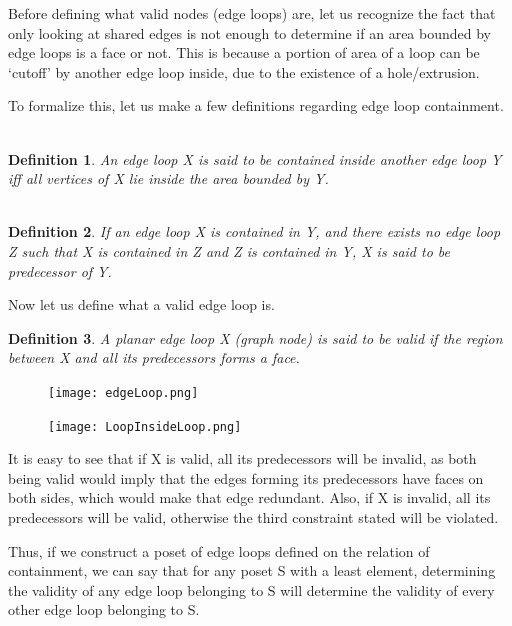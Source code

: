 \documentclass[12pt,a4paper]{article}
\newtheorem{definition}{Definition}
\begin{document}
Before defining what valid nodes (edge loops) are, let us recognize the fact that only looking at shared edges is not enough to determine if an area bounded by edge loops is a  face or not. This is because a portion of area of a loop can be ‘cutoff’ by another edge loop inside, due to the existence of a hole/extrusion. 

To formalize this, let us make a few definitions regarding edge loop containment. \\ \\
\begin{definition}
     An edge loop X is said to be contained inside another edge loop Y iff all vertices of X lie inside the area bounded by Y.  \\  \\
\end{definition}
    
    \begin{definition}
     If an edge loop X is contained in Y, and there exists no edge loop Z such that X is contained in Z and Z is contained in Y, X is said to be predecessor of Y.
        \\ 
\end{definition}
  


Now let us define what a valid edge loop  is.
\begin{definition}
     A planar edge loop X  (graph node) is said to be valid if the region between X and all its predecessors forms a face.
\end{definition}

\begin{figure}
\centering
\texttt{[image: edgeLoop.png]}
\end{figure}

\begin{figure}
\centering
\texttt{[image: LoopInsideLoop.png]}
\end{figure}


It is easy to see that if X is valid, all its predecessors will be invalid, as both being valid would imply that the edges forming its predecessors have faces on both sides, which would make that edge redundant. Also, if X is invalid, all its predecessors will be valid, otherwise the third constraint stated will be violated.

Thus, if we construct a poset of edge loops defined on the relation of containment, we can say that for any poset S with a least element, determining the validity of any edge loop belonging to S will determine the validity of every other edge loop belonging to S. \cite[see chapter 4]{bagchi}
\end{document}
